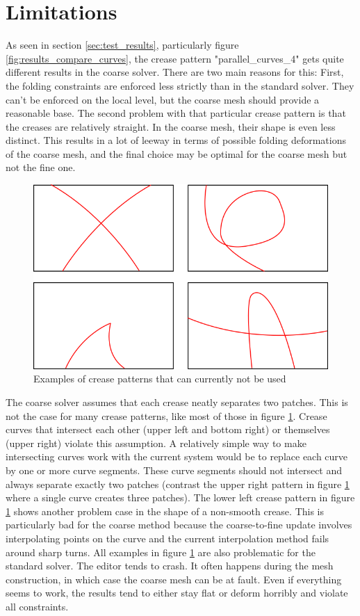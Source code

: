 \documentclass[a4paper,twoside,12pt,nochapterprefix]{scrbook}
\begin{document}
\section{Limitations}\label{sec:problem_cases}
As seen in section \ref{sec:test_results}, particularly figure \ref{fig:results_compare_curves}, the crease pattern "parallel\_curves\_4" gets quite different results in the coarse solver. There are two main reasons for this: First, the folding constraints are enforced less strictly than in the standard solver. They can't be enforced on the local level, but the coarse mesh should provide a reasonable base. The second problem with that particular crease pattern is that the creases are relatively straight. In the coarse mesh, their shape is even less distinct. This results in a lot of leeway in terms of possible folding deformations of the coarse mesh, and the final choice may be optimal for the coarse mesh but not the fine one.\newline
\begin{figure}
    \centering
    \includegraphics[width=0.8\linewidth]{figures/0315_problempatterns}
    \caption{Examples of crease patterns that can currently not be used}
      \label{fig:problempatterns}
\end{figure}
The coarse solver assumes that each crease neatly separates two patches. This is not the case for many crease patterns, like most of those in figure \ref{fig:problempatterns}. Crease curves that intersect each other (upper left and bottom right) or themselves (upper right) violate this assumption. A relatively simple way to make intersecting curves work with the current system would be to replace each curve by one or more curve segments. These curve segments should not intersect and always separate exactly two patches (contrast the upper right pattern in figure \ref{fig:problempatterns} where a single curve creates three patches).\newline
The lower left crease pattern in figure \ref{fig:problempatterns} shows another problem case in the shape of a non-smooth crease. This is particularly bad for the coarse method because the coarse-to-fine update involves interpolating points on the curve and the current interpolation method fails around sharp turns.\newline
All examples in figure \ref{fig:problempatterns} are also problematic for the standard solver. The editor tends to crash. It often happens during the mesh construction, in which case the coarse mesh can be at fault. Even if everything seems to work, the results tend to either stay flat or deform horribly and violate all constraints.\newline
\end{document}
